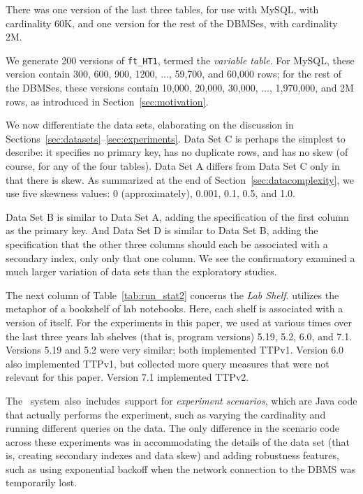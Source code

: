 \documentclass[prodmode,acmtods]{acmsmall}
\def\azdb{\doubleblind{\hbox{\sc AZDBLab}}{\hbox{\sc DBLab}}}
\begin{document}
There was one version of the
last three tables, for use with MySQL, with cardinality 60K, and one version
for the rest of the DBMSes, with cardinality 2M.

We generate 200 versions of {\tt ft\_HT1}, termed the {\em variable table}. For MySQL, these version contain
300, 600, 900, 1200, $\ldots$, 59,700, and 60,000 rows; for the rest of the
DBMSes, these versions contain 10,000, 20,000, 30,000, $\ldots$, 1,970,000,
and 2M rows, as introduced in Section~\ref{sec:motivation}.

We now differentiate the data sets, elaborating on the discussion in Sections~\ref{sec:datasets}--\ref{sec:experiments}. Data Set C is perhaps the simplest to
describe: it specifies no primary key, has no duplicate rows, and has no skew
(of course, for any of the four tables). Data Set A differs from Data Set C
only in that there is skew.  As summarized at the end of
Section~\ref{sec:datacomplexity}, we use five skewness values: 0
(approximately), 0.001, 0.1, 0.5, and 1.0.

Data Set B is similar to Data Set A, adding the specification of the first
column as the primary key. And Data Set D is similar to Data Set B, adding
the specification that the other three columns should each be associated
with a secondary index, only only that one column.
We see the confirmatory examined a much larger variation of data sets than
the exploratory studies.

The next column of Table~\ref{tab:run_stat2} concerns the {\em Lab
  Shelf}. \hbox{\azdb} utilizes the metaphor of a bookshelf of lab
notebooks. Here, each shelf is associated with a version of \hbox{\azdb} itself. For the experiments in this paper, we used at various times over
the last three years lab shelves (that is, program versions) 5.19, 5.2,
6.0, and 7.1. Versions 5.19 and 5.2 were very similar; both implemented
TTPv1.  Version 6.0 also implemented TTPv1, but collected more query
measures that were not relevant for this paper. Version 7.1 implemented
TTPv2.

The \hbox{\azdb\ system also includes support} for {\em experiment scenarios}, which
are Java code that actually performs the experiment, such as varying the
cardinality and running different queries on the data. The only difference
in the scenario code across these experiments was in accommodating the
details of the data set (that is, creating secondary indexes and data skew)
and adding robustness features, such as using exponential backoff when the
network connection to the DBMS was temporarily lost.
\end{document}
